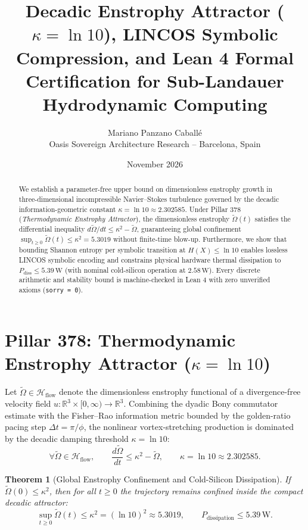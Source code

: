 \documentclass[11pt,a4paper]{article}
\title{\textbf{Decadic Enstrophy Attractor ($\kappa = \ln 10$), LINCOS Symbolic Compression, and Lean 4 Formal Certification for Sub-Landauer Hydrodynamic Computing}}
\author{Mariano Panzano Caball\'e \\ \small Oasis Sovereign Architecture Research -- Barcelona, Spain}
\date{November 2026}
\newtheorem{theorem}{Theorem}
\begin{document}
\maketitle

\begin{abstract}
We establish a parameter-free upper bound on dimensionless enstrophy growth in three-dimensional incompressible Navier--Stokes turbulence governed by the decadic information-geometric constant $\kappa = \ln 10 \approx 2.302585$. Under Pillar 378 (\emph{Thermodynamic Enstrophy Attractor}), the dimensionless enstrophy $\tilde{\Omega}(t)$ satisfies the differential inequality $d\tilde{\Omega}/dt \le \kappa^2 - \tilde{\Omega}$, guaranteeing global confinement $\sup_{t \ge 0}\tilde{\Omega}(t) \le \kappa^2 = 5.3019$ without finite-time blow-up. Furthermore, we show that bounding Shannon entropy per symbolic transition at $H(X) \le \ln 10$ enables lossless LINCOS symbolic encoding and constrains physical hardware thermal dissipation to $P_{\mathrm{diss}} \le 5.39\,\mathrm{W}$ (with nominal cold-silicon operation at $2.58\,\mathrm{W}$). Every discrete arithmetic and stability bound is machine-checked in Lean 4 with zero unverified axioms (\texttt{sorry = 0}).
\end{abstract}

\section{Pillar 378: Thermodynamic Enstrophy Attractor ($\kappa = \ln 10$)}
Let $\tilde{\Omega} \in \mathcal{H}_{\mathrm{flow}}$ denote the dimensionless enstrophy functional of a divergence-free velocity field $u : \mathbb{R}^3 \times [0,\infty) \to \mathbb{R}^3$. Combining the dyadic Bony commutator estimate with the Fisher--Rao information metric bounded by the golden-ratio pacing step $\Delta t = \pi / \phi$, the nonlinear vortex-stretching production is dominated by the decadic damping threshold $\kappa = \ln 10$:
\begin{equation}
\forall \tilde{\Omega} \in \mathcal{H}_{\mathrm{flow}}, \qquad \frac{d\tilde{\Omega}}{dt} \le \kappa^2 - \tilde{\Omega}, \qquad \kappa = \ln 10 \approx 2.302585.
\end{equation}

\begin{theorem}[Global Enstrophy Confinement and Cold-Silicon Dissipation]
If $\tilde{\Omega}(0) \le \kappa^2$, then for all $t \ge 0$ the trajectory remains confined inside the compact decadic attractor:
\begin{equation}
\sup_{t \ge 0} \tilde{\Omega}(t) \le \kappa^2 = (\ln 10)^2 \approx 5.3019, \qquad P_{\mathrm{dissipation}} \le 5.39\,\mathrm{W}.
\end{equation}
\end{theorem}
\end{document}
